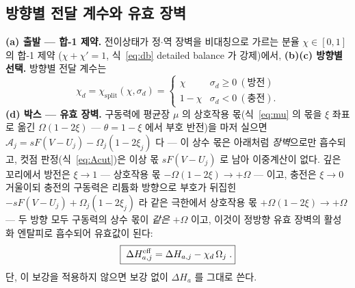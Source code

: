 \subsection{방향별 전달 계수와 유효 장벽}\label{sec:lag-chid}
\textbf{(a) 출발 --- 합-1 제약.} 전이상태가 정$\cdot$역 장벽을 비대칭으로 가르는 분율 $\chi\in[0,1]$ 의 합-1 제약
($\chi+\chi'=1$, 식~\eqref{eq:db} detailed balance 가 강제)에서, \textbf{(b)(c) 방향별 선택.} 방향별 전달 계수는
\begin{equation}
\chi_d=\chi_\mathrm{split}(\chi,\sigma_d)=
\begin{cases}\chi & \sigma_d\ge0\ (\text{방전})\\ 1-\chi & \sigma_d<0\ (\text{충전}).\end{cases}
\label{eq:chid}
\end{equation}
\textbf{(d) 박스 --- 유효 장벽.}
구동력에 평균장 $\mu$ 의 상호작용 몫(식~\eqref{eq:mu} 의 몫을 $\xi$ 좌표로 옮긴 $\Omega(1-2\xi)$ --- $\theta=1-\xi$ 에서 부호 반전)을 마저 실으면
$\mathcal A_j=sF(V-U_j)-\Omega_j(1-2\xi_j)$ 다 --- 이 상수 몫은 아래처럼 \emph{장벽}으로만 흡수되고, 컷점
판정(식~\eqref{eq:Acut})은 이상 몫 $sF(V-U_j)$ 로 남아 이중계산이 없다.
깊은 꼬리에서 방전은 $\xi\to1$ --- 상호작용 몫
$-\Omega(1-2\xi)\to+\Omega$ --- 이고, 충전은 $\xi\to0$ 거울이되 충전의 구동력은 리튬화 방향으로 부호가 뒤집힌
$-sF(V-U_j)+\Omega_j(1-2\xi_j)$ 라 같은 극한에서 상호작용 몫 $+\Omega(1-2\xi)\to+\Omega$ --- 두 방향 모두
구동력의 상수 몫이 \emph{같은} $+\Omega$ 이고, 이것이 정방향 유효 장벽의 활성화 엔탈피로 흡수되어 유효값이 된다:
\begin{equation}
\boxed{\;\Delta H_{a,j}^{\mathrm{eff}}=\Delta H_{a,j}-\chi_d\,\Omega_j\;.}
\label{eq:dHeff}
\end{equation}
단, 이 보강을 적용하지 않으면 보강 없이 $\Delta H_a$ 를 그대로 쓴다.

